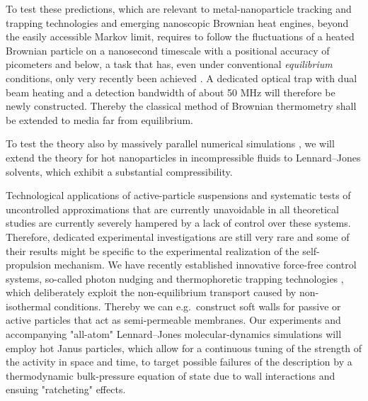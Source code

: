 \begin{workpackage}[id=WPactive,wphases=0-48,
  short=Active Particle Suspensions,%
  title=Probing active particle suspensions with colloids and polymers,
  lead=ULEI,
  ULEIRM=96,UNIPDRM=6,USTUTTRM=2]
\begin{tasklist}
\begin{task}[title=Noise Temperature,id=task3,lead=ULEI,wphases=0-24!0.5]
To test these predictions, which are relevant to metal-nanoparticle tracking and trapping technologies and emerging
nanoscopic Brownian heat engines, beyond the easily accessible Markov limit, requires to follow the fluctuations of 
a heated Brownian particle on a nanosecond timescale with a positional accuracy of picometers and below, a task 
that has, even under conventional \emph{equilibrium} conditions, only very recently been achieved \cite{kheifets-etal:2014}.
%
A dedicated optical trap with dual beam heating and a detection bandwidth of about 50 MHz
will therefore be newly constructed. 
%
Thereby the classical method of Brownian thermometry shall be extended to media far from equilibrium.

To test the theory also by massively parallel numerical simulations \cite{chakraborty-etal:2011}, 
we will extend the theory for hot nanoparticles in incompressible fluids 
to Lennard--Jones solvents, which exhibit a substantial compressibility.
\end{task}

\begin{task}[title=Active-Particle Suspensions,id=task4,lead=ULEI,wphases=24-48!0.5]
Technological applications of active-particle suspensions and systematic tests of
uncontrolled approximations that are currently unavoidable in all theoretical studies are
currently severely hampered by a lack of control over these systems.
%
Therefore, dedicated experimental investigations are still very rare and some of their
results might be specific to the experimental realization of the self-propulsion mechanism.
%
We have recently established innovative force-free control systems, so-called photon nudging
and thermophoretic trapping technologies \cite{Qian2013,Braun:NanoLetters:2015}, which deliberately exploit 
the non-equilibrium transport caused by non-isothermal conditions.
%
Thereby we can e.g.\ construct soft walls for passive or active particles that act as
semi-permeable membranes.
%
Our experiments and accompanying "all-atom" Lennard--Jones molecular-dynamics simulations \cite{chakraborty-etal:2011} 
will employ hot Janus particles, which allow for a continuous tuning of the strength of 
the activity in space and time, to target 
possible failures of the description by a thermodynamic bulk-pressure equation of
state \cite{ginot-etal:2015} due to wall interactions and ensuing "ratcheting" effects.
\end{task}


\end{tasklist}


\end{workpackage}
